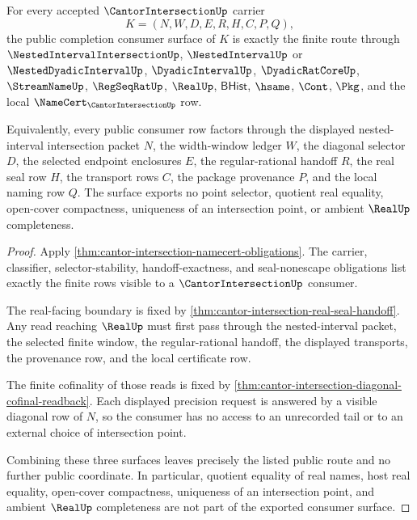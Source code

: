 \begin{theorem}
\label{thm:cantor-intersection-public-completion-consumer}
For every accepted $\CantorIntersectionUp$ carrier
$$
K=(N,W,D,E,R,H,C,P,Q),
$$
the public completion consumer surface of $K$ is exactly the finite route through $\NestedIntervalIntersectionUp$, $\NestedIntervalUp$ or $\NestedDyadicIntervalUp$, $\DyadicIntervalUp$, $\DyadicRatCoreUp$, $\StreamNameUp$, $\RegSeqRatUp$, $\RealUp$, $\mathsf{BHist}$, $\hsame$, $\Cont$, $\Pkg$, and the local $\NameCert_{\CantorIntersectionUp}$ row.

Equivalently, every public consumer row factors through the displayed nested-interval intersection packet $N$, the width-window ledger $W$, the diagonal selector $D$, the selected endpoint enclosures $E$, the regular-rational handoff $R$, the real seal row $H$, the transport rows $C$, the package provenance $P$, and the local naming row $Q$. The surface exports no point selector, quotient real equality, open-cover compactness, uniqueness of an intersection point, or ambient $\RealUp$ completeness.
\end{theorem}
\begin{proof}
Apply \autoref{thm:cantor-intersection-namecert-obligations}. The carrier, classifier, selector-stability, handoff-exactness, and seal-nonescape obligations list exactly the finite rows visible to a $\CantorIntersectionUp$ consumer.

The real-facing boundary is fixed by \autoref{thm:cantor-intersection-real-seal-handoff}. Any read reaching $\RealUp$ must first pass through the nested-interval packet, the selected finite window, the regular-rational handoff, the displayed transports, the provenance row, and the local certificate row.

The finite cofinality of those reads is fixed by \autoref{thm:cantor-intersection-diagonal-cofinal-readback}. Each displayed precision request is answered by a visible diagonal row of $N$, so the consumer has no access to an unrecorded tail or to an external choice of intersection point.

Combining these three surfaces leaves precisely the listed public route and no further public coordinate. In particular, quotient equality of real names, host real equality, open-cover compactness, uniqueness of an intersection point, and ambient $\RealUp$ completeness are not part of the exported consumer surface.
\end{proof}

